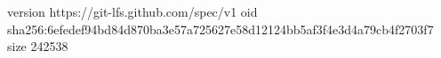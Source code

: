 version https://git-lfs.github.com/spec/v1
oid sha256:6efedef94bd84d870ba3e57a725627e58d12124bb5af3f4e3d4a79cb4f2703f7
size 242538
